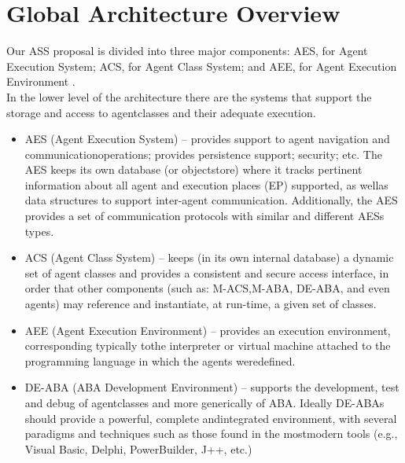 \documentclass{article}
\begin{document}
 \section{Global Architecture Overview}
 Our ASS proposal is divided into three major components: AES, for Agent Execution System; ACS, for Agent Class System; and AEE, for Agent Execution Environment .\\
 In the lower level of the architecture there are the systems that support the storage and access to agentclasses and their adequate execution.
\begin{itemize}
    \item AES (Agent Execution System)
 – provides support to agent navigation and communicationoperations; provides persistence support; security; etc. The AES keeps its own database (or objectstore) where it tracks pertinent information about all agent and execution places (EP) supported, as wellas data structures to support inter-agent communication. Additionally, the AES provides a set of communication protocols with similar and different AESs types.
 \item ACS (Agent Class System)
 – keeps (in its own internal database) a dynamic set of agent classes and provides a consistent and secure access interface, in order that other components (such as: M-ACS,M-ABA, DE-ABA, and even agents) may reference and instantiate, at run-time, a given set of classes.
 \item AEE (Agent Execution Environment)
 – provides an execution environment, corresponding typically tothe interpreter or virtual machine attached to the programming language in which the agents weredefined.
 \item DE-ABA (ABA Development Environment)
 – supports the development, test and debug of agentclasses and more generically of ABA. Ideally DE-ABAs should provide a powerful, complete andintegrated environment, with several paradigms and techniques such as those found in the mostmodern tools (e.g., Visual Basic, Delphi, PowerBuilder, J++, etc.)
 \end{itemize}
\end{document}
